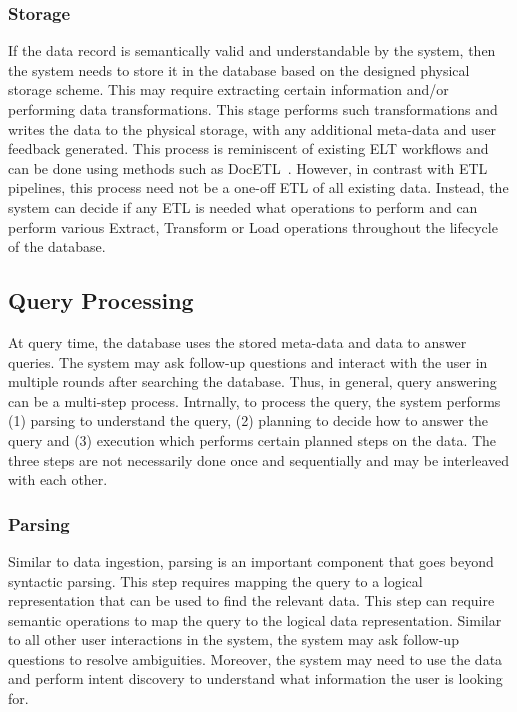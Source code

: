 


\subsubsection{Storage}
If the data record is semantically valid and understandable by the system, then the system needs to store it in the database based on the designed physical storage scheme. This may require extracting certain information and/or performing data transformations. This stage performs such transformations and writes the data to the physical storage, with any additional meta-data and user feedback generated. This process is reminiscent of existing ELT workflows and can be done using methods such as DocETL~\cite{shankar2024docetl}. However, in contrast with ETL pipelines, this process need not be a one-off ETL of all existing data. Instead, the system can decide if any ETL is needed what operations to perform and can perform various Extract, Transform or Load operations throughout the lifecycle of the database. 

\subsection{Query Processing}
At query time, the database uses the stored meta-data and data to answer queries. The system may ask follow-up questions and interact with the user in multiple rounds after searching the database. Thus, in general, query answering can be a multi-step process. Intrnally, to process the query, the system performs (1) parsing to understand the query, (2) planning to decide how to answer the query and (3) execution which performs certain planned steps on the data. The three steps are not necessarily done once and sequentially and may be interleaved with each other. 

\subsubsection{Parsing}
Similar to data ingestion, parsing is an important component that goes beyond syntactic parsing. This step requires mapping the query to a logical representation that can be used to find the relevant data. This step can require semantic operations to map the query to the logical data representation. Similar to all other user interactions in the system, the system may ask follow-up questions to resolve ambiguities. Moreover, the system may need to use the data and perform intent discovery to understand what information the user is looking for. 


